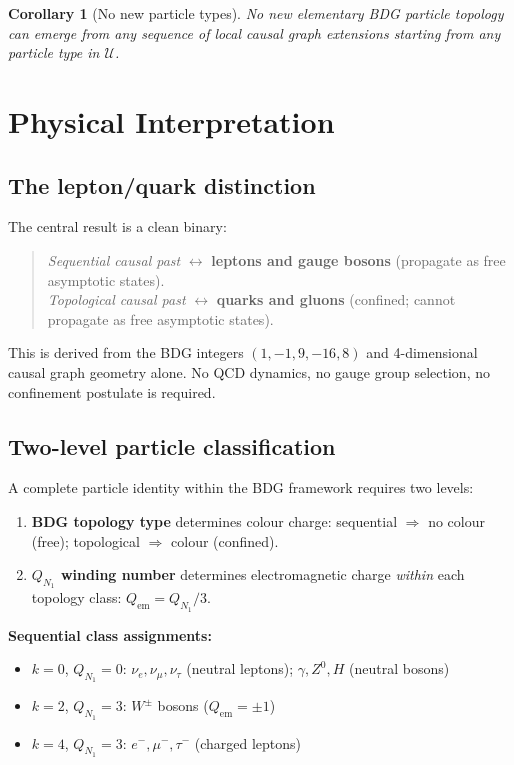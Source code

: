 \documentclass[11pt,a4paper]{article}
\newtheorem{corollary}[theorem]{Corollary}
\begin{document}
\begin{corollary}[No new particle types]
\label{cor:no_new}
No new elementary BDG particle topology can emerge from any sequence of
local causal graph extensions starting from any particle type in $\mathcal{U}$.
\end{corollary}

\section{Physical Interpretation}
\label{sec:physics}

\subsection{The lepton/quark distinction}

The central result is a clean binary:
\begin{quote}
\emph{Sequential causal past} $\longleftrightarrow$ \textbf{leptons and gauge bosons}
(propagate as free asymptotic states).\\
\emph{Topological causal past} $\longleftrightarrow$ \textbf{quarks and gluons}
(confined; cannot propagate as free asymptotic states).
\end{quote}
This is derived from the BDG integers $(1,-1,9,-16,8)$ and 4-dimensional
causal graph geometry alone. No QCD dynamics, no gauge group selection,
no confinement postulate is required.

\subsection{Two-level particle classification}

A complete particle identity within the BDG framework requires two levels:

\begin{enumerate}
  \item \textbf{BDG topology type} determines colour charge:
    sequential $\Rightarrow$ no colour (free); topological $\Rightarrow$ colour (confined).
  \item \textbf{$Q_{N_1}$ winding number} determines electromagnetic charge
    \emph{within} each topology class: $Q_{\mathrm{em}} = Q_{N_1}/3$.
\end{enumerate}

\noindent\textbf{Sequential class assignments:}
\begin{itemize}[noitemsep]
  \item $k=0$, $Q_{N_1}=0$: $\nu_e, \nu_\mu, \nu_\tau$ (neutral leptons);
    $\gamma, Z^0, H$ (neutral bosons)
  \item $k=2$, $Q_{N_1}=3$: $W^{\pm}$ bosons ($Q_\mathrm{em} = \pm 1$)
  \item $k=4$, $Q_{N_1}=3$: $e^-, \mu^-, \tau^-$ (charged leptons)
\end{itemize}
\end{document}
